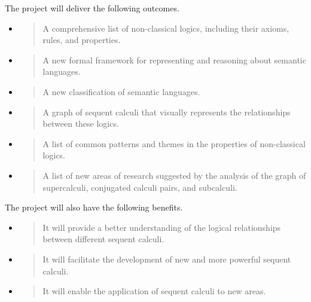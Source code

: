 The project will deliver the following outcomes.

\begin{itemize}
\item
  \begin{quote}
  A comprehensive list of non-classical logics, including their axioms,
  rules, and properties.
  \end{quote}
\item
  \begin{quote}
  A new formal framework for representing and reasoning about semantic
  languages.
  \end{quote}
\item
  \begin{quote}
  A new classification of semantic languages.
  \end{quote}
\item
  \begin{quote}
  A graph of sequent calculi that visually represents the relationships
  between these logics.
  \end{quote}
\item
  \begin{quote}
  A list of common patterns and themes in the properties of
  non-classical logics.
  \end{quote}
\item
  \begin{quote}
  A list of new areas of research suggested by the analysis of the graph
  of supercalculi, conjugated calculi pairs, and subcalculi.
  \end{quote}
\end{itemize}

The project will also have the following benefits.

\begin{itemize}
\item
  \begin{quote}
  It will provide a better understanding of the logical relationships
  between different sequent calculi.
  \end{quote}
\item
  \begin{quote}
  It will facilitate the development of new and more powerful sequent
  calculi.
  \end{quote}
\item
  \begin{quote}
  It will enable the application of sequent calculi to new areas.
  \end{quote}
\end{itemize}

